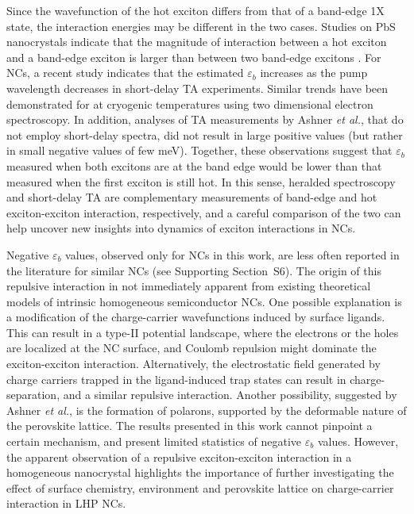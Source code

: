 \documentclass[journal=nalefd, manuscript=letter, layout=twocolumn]{achemso}
\newcommand{\supp}[1]{Supporting Section~S#1}
\begin{document}
Since the wavefunction of the hot exciton differs from that of a band-edge 1X state, the interaction energies may be different in the two cases. Studies on PbS nanocrystals indicate that the magnitude of interaction between a hot exciton and a band-edge exciton is larger than between two band-edge excitons \cite{Geiregat2014}. For  NCs, a recent study indicates that the estimated $\varepsilon_b$ increases as the pump wavelength decreases in short-delay TA experiments\cite{Yumoto2018}. Similar trends have been demonstrated for  at cryogenic temperatures using two dimensional electron spectroscopy\cite{Huang2020}. In addition, analyses of TA measurements by Ashner \textit{et al.}, that do not employ short-delay spectra, did not result in large positive values (but rather in small negative values of few meV)\cite{Ashner2019}. Together, these observations suggest that $\varepsilon_b$ measured when both excitons are at the band edge would be lower than that measured when the first exciton is still hot. In this sense, heralded spectroscopy and short-delay TA are complementary measurements of band-edge and hot exciton-exciton interaction, respectively, and a careful comparison of the two can help uncover new insights into dynamics of exciton interactions in NCs. 

Negative $\varepsilon_b$ values, observed only for  NCs in this work, are less often reported in the literature for similar NCs (see \supp{6}). The origin of this repulsive interaction in not immediately apparent from existing theoretical models of intrinsic homogeneous semiconductor NCs\cite{Nguyen2020,Hu1990}. One possible explanation is a modification of the charge-carrier wavefunctions induced by surface ligands\cite{Baker2010}. This can result in a type-II potential landscape, where the electrons or the holes are localized at the NC surface, and Coulomb repulsion might dominate the exciton-exciton interaction. Alternatively, the electrostatic field generated by charge carriers trapped in the ligand-induced trap states can result in charge-separation, and a similar repulsive interaction. Another possibility, suggested by Ashner \textit{et al.}\cite{Ashner2019}, is the formation of polarons, supported by the deformable nature of the perovskite lattice. The results presented in this work cannot pinpoint a certain mechanism, and present limited statistics of negative $\varepsilon_b$ values. However, the apparent observation of a repulsive exciton-exciton interaction in a homogeneous nanocrystal highlights the importance of further investigating the effect of surface chemistry, environment and perovskite lattice on charge-carrier interaction in LHP NCs.
\end{document}
